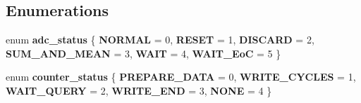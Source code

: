 \subsection*{Enumerations}
\begin{DoxyCompactItemize}
\item 
enum \textbf{ adc\+\_\+status} \{ \newline
\textbf{ N\+O\+R\+M\+AL} = 0, 
\textbf{ R\+E\+S\+ET} = 1, 
\textbf{ D\+I\+S\+C\+A\+RD} = 2, 
\textbf{ S\+U\+M\+\_\+\+A\+N\+D\+\_\+\+M\+E\+AN} = 3, 
\newline
\textbf{ W\+A\+IT} = 4, 
\textbf{ W\+A\+I\+T\+\_\+\+EoC} = 5
 \}
\item 
enum \textbf{ counter\+\_\+status} \{ \newline
\textbf{ P\+R\+E\+P\+A\+R\+E\+\_\+\+D\+A\+TA} = 0, 
\textbf{ W\+R\+I\+T\+E\+\_\+\+C\+Y\+C\+L\+ES} = 1, 
\textbf{ W\+A\+I\+T\+\_\+\+Q\+U\+E\+RY} = 2, 
\textbf{ W\+R\+I\+T\+E\+\_\+\+E\+ND} = 3, 
\newline
\textbf{ N\+O\+NE} = 4
 \}
\end{DoxyCompactItemize}

